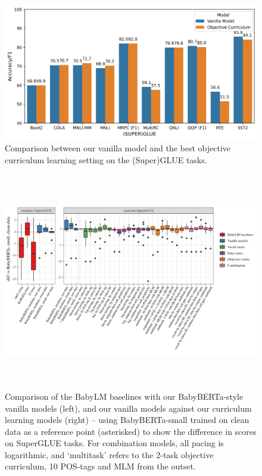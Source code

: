 \begin{figure}[h]
\centering
\includegraphics[width=0.5 \textwidth]{chapters/climb/figures/baseline_vs_obj_cl_superglue.png}
\caption{\label{fig:baseline_obj_cl_superglue} Comparison between our vanilla model and the best objective curriculum learning setting on the (Super)GLUE tasks.}
\end{figure}



\begin{figure}
\centering
\includegraphics[height=9.5cm]{chapters/climb/figures/babylm_superglue_diffs_boxplots.png}
\caption{\label{fig:glue-boxplots} Comparison of the BabyLM baselines with our BabyBERTa-style vanilla models (left), and our vanilla models against our curriculum learning models (right) -- using BabyBERTa-small trained on clean data as a reference point (asterisked) to show the difference in scores on SuperGLUE tasks. For combination models, all pacing is logarithmic, and `multitask' refers to the 2-task objective curriculum, 10 POS-tags and MLM from the outset. 
}
\end{figure}

